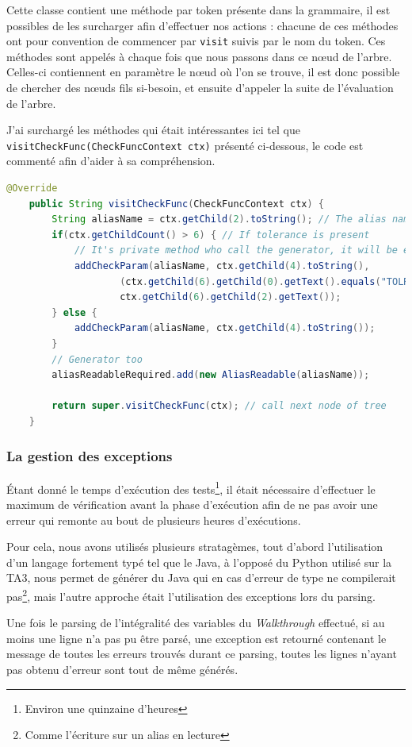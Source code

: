 	Cette classe contient une méthode par token présente dans la grammaire, il est possibles de les surcharger afin d'effectuer nos actions : chacune de ces méthodes ont pour convention de commencer par \texttt{visit} suivis par le nom du token. Ces méthodes sont appelés à chaque fois que nous passons dans ce n\oe{}ud de l'arbre. Celles-ci contiennent en paramètre le n\oe{}ud où l'on se trouve, il est donc possible de chercher des nœuds fils si-besoin, et ensuite d'appeler la suite de l'évaluation de l'arbre. 

	J'ai surchargé les méthodes qui était intéressantes ici tel que \texttt{visitCheckFunc(CheckFuncContext ctx)} présenté ci-dessous, le code est commenté afin d'aider à sa compréhension.
\begin{lstlisting}[language=Java, caption=Surcharge de \texttt{visitCheckFunc}]
	@Override
	public String visitCheckFunc(CheckFuncContext ctx) {
		String aliasName = ctx.getChild(2).toString(); // The alias name to check
		if(ctx.getChildCount() > 6) { // If tolerance is present
			// It's private method who call the generator, it will be explained after
			addCheckParam(aliasName, ctx.getChild(4).toString(), 
					(ctx.getChild(6).getChild(0).getText().equals("TOLRES") ? TolType.TOLRES : TolType.TOLPER), 
					ctx.getChild(6).getChild(2).getText());
		} else {
			addCheckParam(aliasName, ctx.getChild(4).toString());
		}
		// Generator too
		aliasReadableRequired.add(new AliasReadable(aliasName));

		return super.visitCheckFunc(ctx); // call next node of tree
	}
\end{lstlisting}
		\subsubsection{La gestion des exceptions}
\'Etant donné le temps d'exécution des tests\footnote{Environ une quinzaine d'heures}, il était nécessaire d'effectuer le maximum de vérification avant la phase d'exécution afin de ne pas avoir une erreur qui remonte au bout de plusieurs heures d'exécutions. 

Pour cela, nous avons utilisés plusieurs stratagèmes, tout d'abord l'utilisation d'un langage fortement typé tel que le Java, à l'opposé du Python utilisé sur la TA3, nous permet de générer du Java qui en cas d'erreur de type ne compilerait pas\footnote{Comme l'écriture sur un alias en lecture}, mais l'autre approche était l'utilisation des exceptions lors du parsing.

Une fois le parsing de l'intégralité des variables du \textit{Walkthrough} effectué, si au moins une ligne n'a pas pu être parsé, une exception est retourné contenant le message de toutes les erreurs trouvés durant ce parsing, toutes les lignes n'ayant pas obtenu d'erreur sont tout de même générés.


